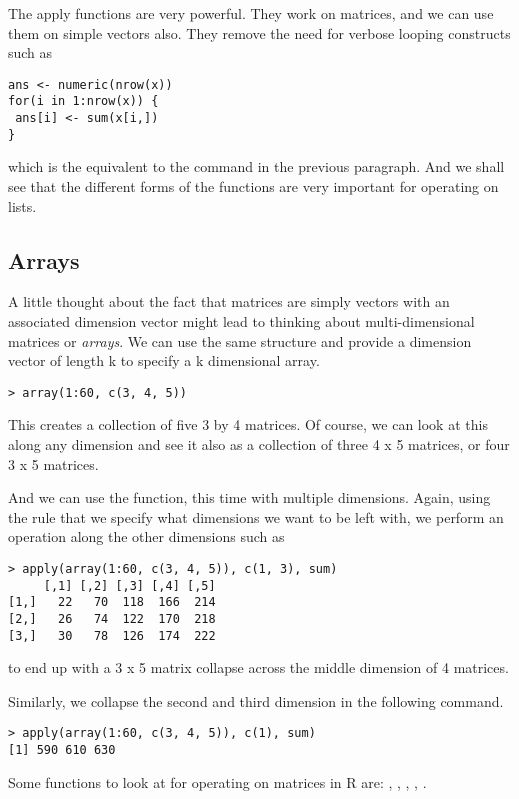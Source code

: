 The apply functions are very powerful. They work on matrices, and we
can use them on simple vectors also. They remove the need for verbose
looping constructs such as
\begin{verbatim}
ans <- numeric(nrow(x))
for(i in 1:nrow(x)) {
 ans[i] <- sum(x[i,])
}
\end{verbatim}
which is the equivalent to the  command in the
previous paragraph. And we shall see that the different forms of the
 functions are very important for operating on lists.

\subsection{Arrays}
A little thought about the fact that matrices are simply vectors with
an associated dimension vector might lead to thinking about
multi-dimensional matrices or {\em{arrays}}. We can use the same
structure and provide a dimension vector of length k to specify a k
dimensional array.
\begin{verbatim}
> array(1:60, c(3, 4, 5))
\end{verbatim}
This creates a collection of five 3 by 4 matrices. Of course, we can
look at this along any dimension and see it also as a collection of
three 4 x 5 matrices, or four 3 x 5 matrices.

And we can use the  function, this time with multiple
dimensions. Again, using the rule that we specify what dimensions we
want to be left with, we perform an operation along the other
dimensions such as
\begin{verbatim}
> apply(array(1:60, c(3, 4, 5)), c(1, 3), sum)
     [,1] [,2] [,3] [,4] [,5]
[1,]   22   70  118  166  214
[2,]   26   74  122  170  218
[3,]   30   78  126  174  222
\end{verbatim}
to end up with a 3 x 5 matrix collapse across the middle dimension of
4 matrices.

Similarly, we collapse the second and third dimension in the following
command.
\begin{verbatim}
> apply(array(1:60, c(3, 4, 5)), c(1), sum)
[1] 590 610 630
\end{verbatim}


Some functions to look at for operating on matrices in R are:
, , ,
, .
